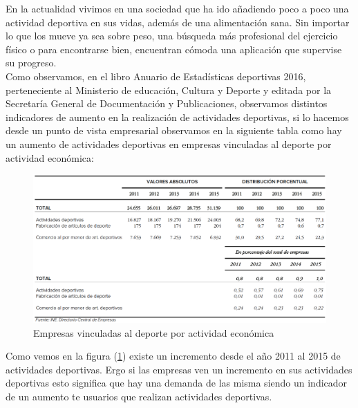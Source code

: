 \documentclass[a4paper, 11pt]{article}
\begin{document}

      En la actualidad vivimos en una sociedad que ha ido añadiendo poco a poco
      una actividad deportiva en sus vidas, además de una alimentación sana. Sin
      importar lo que los mueve ya sea sobre peso, una búsqueda más profesional
      del ejercicio físico o para encontrarse bien, encuentran cómoda una
      aplicación que supervise su progreso. \\

      Como observamos, en el libro Anuario de Estadísticas deportivas 2016,
      perteneciente al Ministerio de educación, Cultura y Deporte y editada por
      la Secretaría General de Documentación y Publicaciones, observamos
      distintos indicadores de aumento en la realización de actividades
      deportivas, si lo hacemos desde un punto de vista empresarial observamos
      en la siguiente tabla como hay un aumento de actividades deportivas en
      empresas vinculadas al deporte por actividad económica:\\

      \begin{figure}[H]
          \centering
          \includegraphics[width=1\textwidth]{empresas-vinculadas-al-deporte-por-actividad-economica}
          \caption{Empresas vinculadas al deporte por actividad económica}
          \label{f:empresas}
      \end{figure}

      Como vemos en la figura (\ref{f:empresas}) existe un incremento desde el
      año 2011 al 2015 de actividades deportivas. Ergo si las empresas ven un
      incremento en sus actividades deportivas esto significa que hay una demanda
      de las misma siendo un indicador de un aumento te usuarios que realizan
      actividades deportivas.\\
\end{document}
